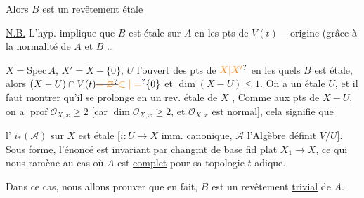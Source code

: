 
Alors $B$ est un revêtement étale 

\uline{N.B.} L'hyp. implique que $B$ est étale sur $A$ en les pts de $V(t)-\text{origine}$ (grâce à la normalité de $A$ et $B$ \ldots\unsure{]|)} 


  $X=\mathrm{Spec}\,A$,  $X'=X-\{0\}$, $U$ l'ouvert des
pts de $\unsure{X|X'}$ en les quels $B$ est étale, alors
\deleted{[si $U\ne X$]} $(X-U)\cap V(t)\deleted{\unsure{=\varnothing}}\unsure{\subset|=}\{0\}$ et
$\dim(X-U)\leq 1$. On a un  étale
  $U$, et il faut montrer qu'il se
prolonge en un rev. étale de $X$ , 
 
Comme aux pts de $X-U$,
on a $\operatorname{prof}\mathscr O_{X,x}\geq 2$ [car $\dim\mathscr O_{X,x}\geq 2$,
et $\mathscr O_{X,x}$ est normal], cela signifie que




l' $i_*(\mathscr A)$ sur $X$ est étale [$i:U\longrightarrow X$
imm. canonique, $\mathscr A$ l'Algèbre   définit
$V/U$]. Sous  forme, l'énoncé est
invariant par  changmt de base fid plat
  $X_1\longrightarrow X$, ce qui nous ramène
au cas où $A$ est \uline{complet}  pour sa
 topologie $t$-adique.



Dans ce cas, nous allons prouver que en
fait, $B$ est un revêtement \uline{trivial} de $A$.

